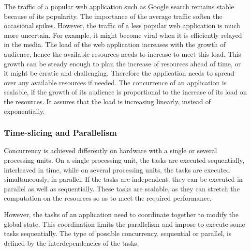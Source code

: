 The traffic of a popular web application such as Google search remains stable because of its popularity.
The importance of the average traffic soften the occasional spikes.
However, the traffic of a less popular web application is much more uncertain.
For example, it might become viral when it is efficiently relayed in the media.
The load of the web application increases with the growth of audience, hence the available resources needs to increase to meet this load.
This growth can be steady enough to plan the increase of resources ahead of time, or it might be erratic and challenging.
Therefore the application needs to spread over any available resources if needed.
The concurrence of an application is scalable, if the growth of its audience is proportional to the increase of its load on the resources.
It assures that the load is increasing linearly, instead of exponentially.

\subsubsection{Time-slicing and Parallelism}

Concurrency is achieved differently on hardware with a single or several processing units.
On a single processing unit, the tasks are executed sequentially, interleaved in time, while on several processing units, the tasks are executed simultaneously, in parallel.
If the tasks are independent, they can be executed in parallel as well as sequentially.
These tasks are scalable, as they can stretch the computation on the resources so as to meet the required performance.

However, the tasks of an application need to coordinate together to modify the global state.
This coordination limits the parallelism and impose to execute some tasks sequentially.
The type of possible concurrency, sequential or parallel, is defined by the interdependencies of the tasks.

